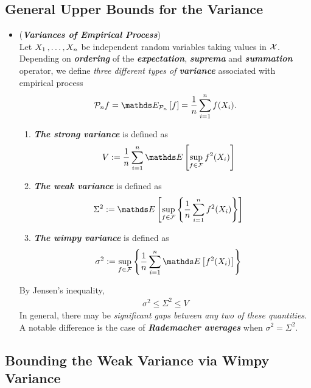 \documentclass[11pt]{article}
\begin{document}
\subsection{General Upper Bounds for the Variance}
\begin{itemize}
\item \begin{definition}(\textbf{\emph{Variances of Empirical Process}})\\
Let $X_1 \,{,}\ldots{,}\, X_n$ be independent random variables taking values in ${\mathcal X}$.  Depending on \emph{\textbf{ordering}} of the \emph{\textbf{expectation}}, \emph{\textbf{suprema}} and \emph{\textbf{summation}} operator, we define \emph{three different types of \textbf{variance}} associated with empirical process
\begin{align*}
\cP_n f = \E{\cP_n}{f} = \frac{1}{n}\sum_{i=1}^n f(X_i).
\end{align*}
\begin{enumerate}
\item \emph{\textbf{The strong variance}} is defined as
\begin{align}
V &:= \frac{1}{n}\sum_{i=1}^n \E{}{\sup_{f\in \cF}f^2(X_i)}  \label{def: strong_variance_emp_process}
\end{align}
\item  \emph{\textbf{The weak variance}} is defined as
\begin{align}
\Sigma^2 &:= \E{}{\sup_{f \in \cF}\set{\frac{1}{n}\sum_{i=1}^{n}f^2(X_i)}}  \label{def: weak_variance_emp_process}
\end{align}
\item  \emph{\textbf{The wimpy variance}} is defined as
\begin{align}
\sigma^2 &:= \sup_{f\in \cF}\set{\frac{1}{n}\sum_{i=1}^n \E{}{f^2(X_i)}} \label{def: wimpy_variance_emp_process}
\end{align}
\end{enumerate} 
By Jensen's inequality, 
\begin{align*}
\sigma^2 \le \Sigma^2 \le V
\end{align*} In general, there may be \emph{significant gaps between any two of these quantities}. A notable difference is the case of \emph{\textbf{Rademacher averages}} when $\sigma^2 = \Sigma^2$.
\end{definition}
\end{itemize}

\subsection{Bounding the Weak Variance via Wimpy Variance}
\end{document}
